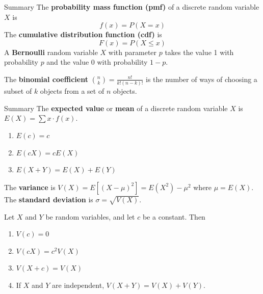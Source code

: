 \documentclass[xcolor=table]{beamer}
\renewcommand{\emph}{\textbf}
\begin{document}
\begin{frame}{Summary}
The \emph{probability mass function (pmf)} of a discrete random variable $X$ is
$$f(x) = P(X = x)$$
The \emph{cumulative distribution function (cdf)} is
$$F(x) = P(X \leq x)$$
A \emph{Bernoulli} random variable $X$ with parameter $p$ takes the value 1 with probability $p$ and the value 0 with probability $1-p$.

\vspace{.3cm}
The \emph{binomial coefficient} $\binom n k=\frac{n!}{k!(n-k)!}$
is the number of ways of choosing a subset of $k$ objects from a set of $n$ objects.
\end{frame}

\begin{frame}{Summary}
The \emph{expected value} or \emph{mean} of a discrete random variable $X$ is $E(X)=\sum x\cdot f(x)$.
\begin{block}{}
\begin{enumerate}
\item $E(c) = c$
\item $E(cX) = cE(X)$
\item $E(X+Y) = E(X)+E(Y)$
\end{enumerate}
\end{block}

The \emph{variance} is $V(X)=E[(X-\mu)^2]=E(X^2)-\mu^2$ where $\mu=E(X)$. The \emph{standard deviation} is $\sigma = \sqrt{V(X)}$.
\begin{block}{}
Let $X$ and $Y$ be random variables, and let $c$ be a constant. Then
\begin{enumerate}
\item $V(c) = 0$
\item $V(cX) = c^2V(X)$
\item $V(X+c) = V(X)$
\item If $X$ and $Y$ are independent, $V(X+Y)=V(X)+V(Y)$.
\end{enumerate}
\end{block}

\end{frame}
\end{document}
